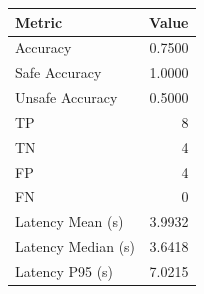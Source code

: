 \begin{table}[ht]
\centering
\begin{tabular}{lr}
\toprule
Metric & Value \\
\midrule
Accuracy & 0.7500 \\
Safe Accuracy & 1.0000 \\
Unsafe Accuracy & 0.5000 \\
TP & 8 \\
TN & 4 \\
FP & 4 \\
FN & 0 \\
Latency Mean (s) & 3.9932 \\
Latency Median (s) & 3.6418 \\
Latency P95 (s) & 7.0215 \\
\bottomrule
\end{tabular}
\end{table}